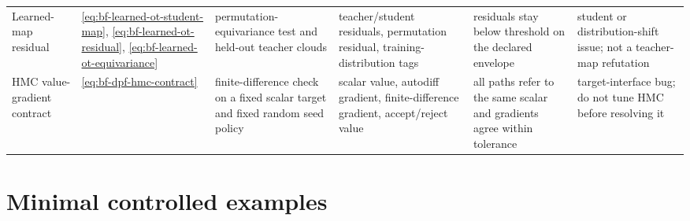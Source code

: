 \begin{center}
\begin{longtable}{@{}p{} p{} p{} p{} p{} p{}@{}}
Learned-map residual &
\eqref{eq:bf-learned-ot-student-map}, \eqref{eq:bf-learned-ot-residual}, \eqref{eq:bf-learned-ot-equivariance} &
permutation-equivariance test and held-out teacher clouds &
teacher/student residuals, permutation residual, training-distribution tags &
residuals stay below threshold on the declared envelope &
student or distribution-shift issue; not a teacher-map refutation \\
HMC value-gradient contract &
\eqref{eq:bf-dpf-hmc-contract} &
finite-difference check on a fixed scalar target and fixed random seed policy &
scalar value, autodiff gradient, finite-difference gradient, accept/reject value &
all paths refer to the same scalar and gradients agree within tolerance &
target-interface bug; do not tune HMC before resolving it \\
\end{longtable}
\end{center}

\section{Minimal controlled examples}
\label{sec:bf-dpf-debug-controlled-examples}


